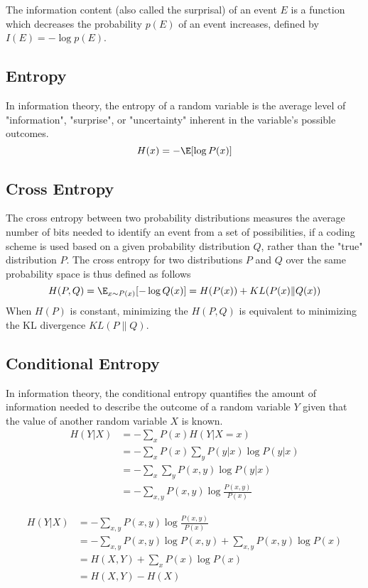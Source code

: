 The information content (also called the surprisal) of an event $E$ is a function which decreases the probability $p(E)$
of an event increases, defined by $I(E) = - \log p(E)$.

\subsection{Entropy}

In information theory, the entropy of a random variable is the average level of "information", "surprise", or "uncertainty" inherent in the variable's possible outcomes.
\begin{equation}
    H(x) = -\E[\log P(x)]
\end{equation}

\subsection{Cross Entropy}
The cross entropy between two probability distributions measures the average number of bits needed to identify an
event from a set of possibilities, if a coding scheme is used based on a given probability distribution $Q$, rather
than the "true" distribution $P$. The cross entropy for two distributions $P$ and $Q$ over the same probability
space is thus defined as follows
\begin{equation}
    H(P, Q) = \E_{x \sim P(x)}[- \log Q(x)] = H(P(x)) + KL(P(x)\|Q(x))
\end{equation}
When $H(P)$ is constant, minimizing the $H(P, Q)$ is equivalent to minimizing the KL divergence $KL(P\|Q)$.

\subsection{Conditional Entropy}
In information theory, the conditional entropy quantifies the amount of information needed to describe the outcome of a random variable
$Y$ given that the value of another random variable $X$ is known.
\[
    \begin{split}
        H(Y|X)
        &= -\sum_x P(x) H(Y|X=x) \\
        &= -\sum_x P(x) \sum_y P(y|x) \log P(y|x) \\
        &= -\sum_x \sum_y P(x, y) \log P(y|x) \\
        &= -\sum_{x,y} P(x, y) \log \frac{P(x, y)}{P(x)} 
    \end{split}
\]

\[
    \begin{split}
        H(Y|X)
        &= -\sum_{x,y} P(x, y) \log \frac{P(x, y)}{P(x)} \\
        &= -\sum_{x,y} P(x,y) \log P(x, y) + \sum_{x,y} P(x, y) \log P(x) \\
        &= H(X, Y) + \sum_{x} P(x) \log P(x) \\
        &= H(X, Y) - H(X)
    \end{split}
\]
    

